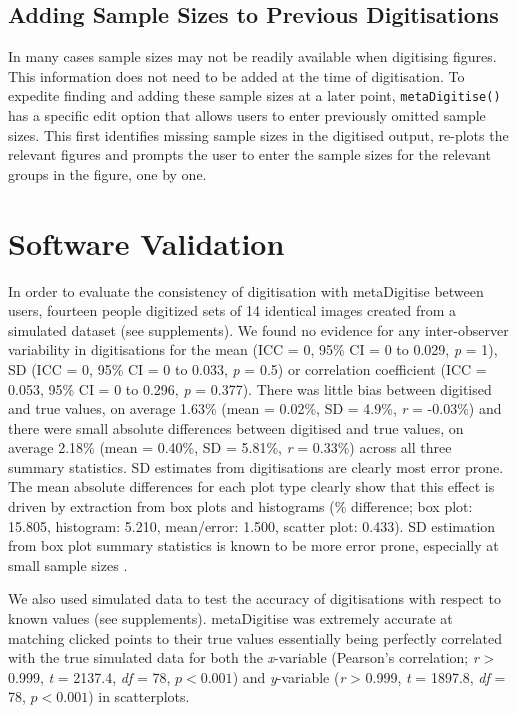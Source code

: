 \documentclass[12pt]{article}
\newcommand{\fct}[1]{\texttt{#1()}}
\newcommand{\pkg}[1]{{\fontseries{b}\selectfont #1}}
\begin{document}
\subsection{Adding Sample Sizes to Previous Digitisations}
In many cases sample sizes may not be readily available when digitising figures. This information does not need to be added at the time of digitisation. To expedite finding and adding these sample sizes at a later point, \fct{metaDigitise} has a specific edit option that allows users to enter previously omitted sample sizes. This first identifies missing sample sizes in the digitised output, re-plots the relevant figures and prompts the user to enter the sample sizes for the relevant groups in the figure, one by one. 





\section{Software Validation}
In order to evaluate the consistency of digitisation with \pkg{metaDigitise} between users, fourteen people digitized sets of 14 identical images created from a simulated dataset (see supplements). We found no evidence for any inter-observer variability in digitisations for the mean (ICC = 0, 95\% CI = 0 to 0.029, \textit{p} = 1), SD (ICC = 0, 95\% CI = 0 to 0.033, \textit{p} = 0.5) or correlation coefficient (ICC = 0.053, 95\% CI = 0 to 0.296, \textit{p} = 0.377). There was little bias between digitised and true values, on average 1.63\% (mean = 0.02\%, SD = 4.9\%, \textit{r} = -0.03\%) and there were small absolute differences between digitised and true values, on average 2.18\% (mean = 0.40\%, SD = 5.81\%, \textit{r} = 0.33\%) across all three summary statistics. SD estimates from digitisations are clearly most error prone. The mean absolute differences for each plot type clearly show that this effect is driven by extraction from box plots and histograms (\% difference; box plot: 15.805, histogram: 5.210, mean/error: 1.500, scatter plot: 0.433). SD estimation from box plot summary statistics is known to be more error prone, especially at small sample sizes \citep{Wan2014}. 

We also used simulated data to test the accuracy of digitisations with respect to known values (see supplements). \pkg{metaDigitise} was extremely accurate at matching clicked points to their true values essentially being perfectly correlated with the true simulated data for both the \textit{x}-variable (Pearson's correlation; \textit{r} > 0.999, \textit{t} = 2137.4, \textit{df} = 78, $p < 0.001$) and \textit{y}-variable (\textit{r} > 0.999, \textit{t} = 1897.8, \textit{df} = 78, $p < 0.001$) in scatterplots.
\end{document}
